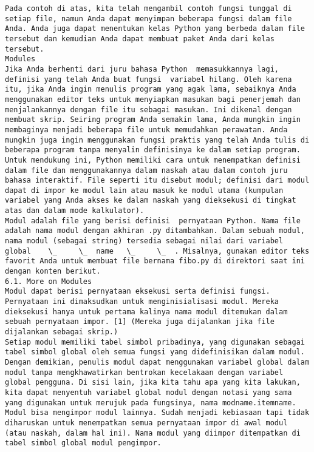 \begin{verbatim}
Pada contoh di atas, kita telah mengambil contoh fungsi tunggal di setiap file, namun Anda dapat menyimpan beberapa fungsi dalam file Anda. Anda juga dapat menentukan kelas Python yang berbeda dalam file tersebut dan kemudian Anda dapat membuat paket Anda dari kelas tersebut.
Modules  
Jika Anda berhenti dari juru bahasa Python  memasukkannya lagi, definisi yang telah Anda buat fungsi  variabel hilang. Oleh karena itu, jika Anda ingin menulis program yang agak lama, sebaiknya Anda menggunakan editor teks untuk menyiapkan masukan bagi penerjemah dan menjalankannya dengan file itu sebagai masukan. Ini dikenal dengan membuat skrip. Seiring program Anda semakin lama, Anda mungkin ingin membaginya menjadi beberapa file untuk memudahkan perawatan. Anda mungkin juga ingin menggunakan fungsi praktis yang telah Anda tulis di beberapa program tanpa menyalin definisinya ke dalam setiap program.  
Untuk mendukung ini, Python memiliki cara untuk menempatkan definisi dalam file dan menggunakannya dalam naskah atau dalam contoh juru bahasa interaktif. File seperti itu disebut modul; definisi dari modul dapat di impor ke modul lain atau masuk ke modul utama (kumpulan variabel yang Anda akses ke dalam naskah yang dieksekusi di tingkat atas dan dalam mode kalkulator).  
Modul adalah file yang berisi definisi  pernyataan Python. Nama file adalah nama modul dengan akhiran .py ditambahkan. Dalam sebuah modul, nama modul (sebagai string) tersedia sebagai nilai dari variabel global    \_     \_  name   \_     \_  . Misalnya, gunakan editor teks favorit Anda untuk membuat file bernama fibo.py di direktori saat ini dengan konten berikut.  
6.1. More on Modules 
Modul dapat berisi pernyataan eksekusi serta definisi fungsi. Pernyataan ini dimaksudkan untuk menginisialisasi modul. Mereka dieksekusi hanya untuk pertama kalinya nama modul ditemukan dalam sebuah pernyataan impor. [1] (Mereka juga dijalankan jika file dijalankan sebagai skrip.)  
Setiap modul memiliki tabel simbol pribadinya, yang digunakan sebagai tabel simbol global oleh semua fungsi yang didefinisikan dalam modul. Dengan demikian, penulis modul dapat menggunakan variabel global dalam modul tanpa mengkhawatirkan bentrokan kecelakaan dengan variabel global pengguna. Di sisi lain, jika kita tahu apa yang kita lakukan, kita dapat menyentuh variabel global modul dengan notasi yang sama yang digunakan untuk merujuk pada fungsinya, nama modname.itemname. 
Modul bisa mengimpor modul lainnya. Sudah menjadi kebiasaan tapi tidak diharuskan untuk menempatkan semua pernyataan impor di awal modul (atau naskah, dalam hal ini). Nama modul yang diimpor ditempatkan di tabel simbol global modul pengimpor.  

\end{verbatim}

